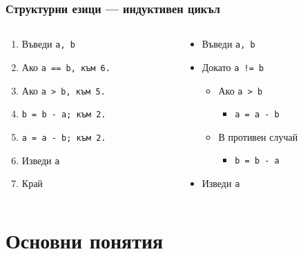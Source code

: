 \documentclass{beamer}
\begin{document}
\begin{frame}
  \frametitle{Структурни езици — индуктивен цикъл}

  \begin{columns}[t,onlytextwidth]
    \begin{column}{.5\textwidth}
      \begin{enumerate}
      \item Въведи \tt a, \tt b
      \item Ако \tt{a == b}, към 6.
      \item Ако \tt{a > b}, към 5.
      \item \tt{b = b - a}; към 2.
      \item \tt{a = a - b}; към 2.
      \item Изведи \tt a
      \item Край
      \end{enumerate}
    \end{column}
    \begin{column}{.5\textwidth}
      \begin{itemize}
      \item Въведи \tt a, \tt b
      \item Докато \tt{a != b}
        \begin{itemize}
        \item Ако \tt{a > b}
          \begin{itemize}
          \item \tt{a = a - b}
          \end{itemize}
        \item В противен случай
          \begin{itemize}
          \item \tt{b = b - a}
          \end{itemize}
        \end{itemize}
      \item Изведи \tt a
      \end{itemize}
    \end{column}
  \end{columns}
\end{frame}

\section{Основни понятия}
\end{document}
